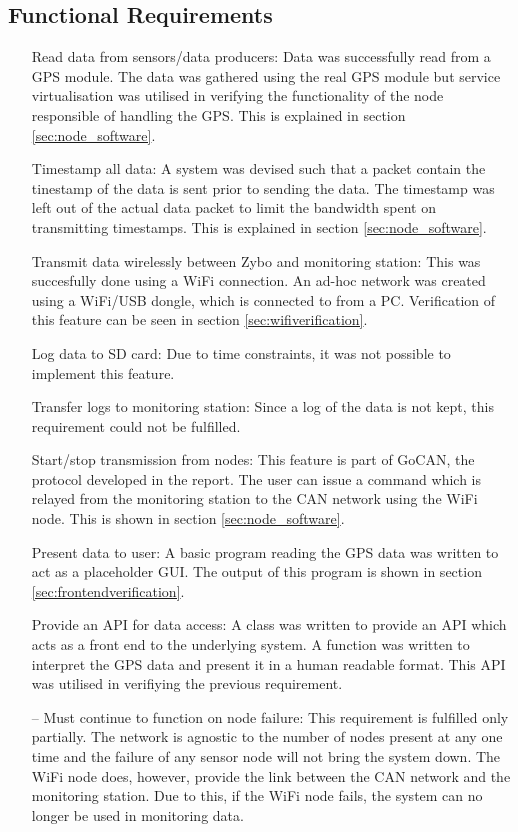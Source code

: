 \subsection{Functional Requirements}
\begin{itemize}
	\item[\cmark] Read data from sensors/data producers:
	Data was successfully read from a GPS module.
	The data was gathered using the real GPS module but service virtualisation was utilised in verifying the functionality of the node responsible of handling the GPS.
	This is explained in section \ref{sec:node_software}.
	\item[\cmark] Timestamp all data:
	A system was devised such that a packet contain the tinestamp of the data is sent prior to sending the data.
	The timestamp was left out of the actual data packet to limit the bandwidth spent on transmitting timestamps.
	This is explained in section \ref{sec:node_software}.
	\item[\cmark] Transmit data wirelessly between Zybo and monitoring station:
	This was succesfully done using a WiFi connection.
	An ad-hoc network was created using a WiFi/USB dongle, which is connected to from a PC.
	Verification of this feature can be seen in section \ref{sec:wifiverification}.
	\item[\xmark] Log data to SD card:
	Due to time constraints, it was not possible to implement this feature.
	\item[\xmark] Transfer logs to monitoring station:
	Since a log of the data is not kept, this requirement could not be fulfilled.
	\item[\cmark] Start/stop transmission from nodes:
	This feature is part of GoCAN, the protocol developed in the report.
	The user can issue a command which is relayed from the monitoring station to the CAN network using the WiFi node.
	This is shown in section \ref{sec:node_software}.
	\item[\cmark] Present data to user:
	A basic program reading the GPS data was written to act as a placeholder GUI.
	The output of this program is shown in section \ref{sec:frontendverification}.
	\item[\cmark] Provide an API for data access:
	A class was written to provide an API which acts as a front end to the underlying system.
	A function was written to interpret the GPS data and present it in a human readable format.
	This API was utilised in verifiying the previous requirement.
	\item[--] Must continue to function on node failure:
	This requirement is fulfilled only partially. 
	The network is agnostic to the number of nodes present at any one time and the failure of any sensor node will not bring the system down.
	The WiFi node does, however, provide the link between the CAN network and the monitoring station.
	Due to this, if the WiFi node fails, the system can no longer be used in monitoring data.
\end{itemize}

